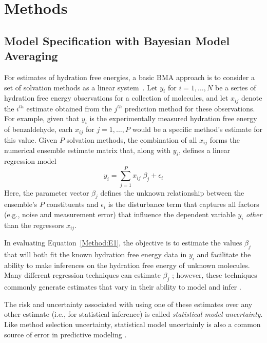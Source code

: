 \documentclass[12pt]{article}
\newcommand{\+}[1]{\ensuremath{\mathbf{#1}}}
\begin{document}
\section{Methods}
\label{MethodMain}
\subsection{Model Specification with Bayesian Model Averaging}
\label{Method} 
For estimates of hydration free energies, a basic BMA approach is to consider a set of solvation methods as a linear system~\cite{Hoeting:1999,Raftery:1998,Raftery:1995}.  Let $y_i$ for $i = 1, \ldots, N$ be a series of hydration free energy observations for a collection of molecules, and let $x_{i j}$ denote the $i^{th}$ estimate obtained from the $j^{th}$ prediction method for these observations. For example, given that $y_i$ is the experimentally measured hydration free energy of benzaldehyde, each $x_{i j}$ for $j = 1, \ldots, P$ would be a specific method's estimate for this value.  Given $P$ solvation methods, the combination of all $x_{ij}$ forms the numerical ensemble estimate matrix that, along with $y_i$, defines a linear regression model 
\begin{equation}
	\label{Method:E1}
	y_i = \sum_{j=1}^P x_{ij} \;\beta_j + \epsilon_i
\end{equation}
Here, the parameter vector $\beta_j$ defines the unknown relationship between the ensemble's $P$ constituents and $\epsilon_i$ is the disturbance term that captures all factors (e.g., noise and measurement error) that influence the dependent variable $y_i$ \emph{other} than the regressors $x_{ij}$.

In evaluating Equation~\ref{Method:E1}, the objective is to estimate the values $\beta_j$ that will both fit the known hydration free energy data in $y_i$ and facilitate the ability to make inferences on the hydration free energy of unknown molecules.  Many different regression techniques can estimate $\beta_j$ \cite{Hosmer:1989,Reiss:2012,Mallows:1973,Candes:2007}; however, these techniques commonly generate estimates that vary in their ability to model and infer \cite{Genell:2010,Hoeting:1999,Davidson:2006,Raftery:1995,Raftery:1998}.  

The risk and  uncertainty associated with using one of these estimates over any other estimate (i.e., for statistical inference) is called \emph{statistical model uncertainty}. Like method selection uncertainty, statistical model uncertainly is also a common source of error in predictive modeling \cite{Raftery:1995,Raftery:1998,Hoeting:1999,Raftery:2005,Volinsky:1997}.  
\end{document}
